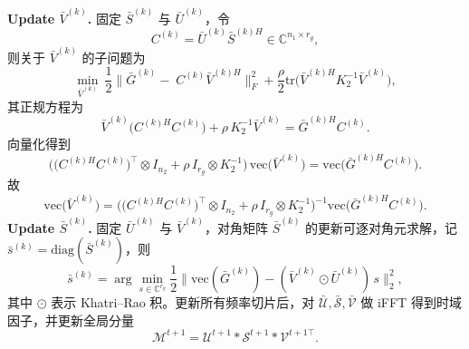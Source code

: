 \documentclass[UTF8]{ctexart}
\begin{document}
\noindent\textbf{Update $\bar V^{(k)}$.}
固定 $\bar S^{(k)}$ 与 $\bar U^{(k)}$，令
\[
C^{(k)}=\bar U^{(k)}\bar S^{(k)H}\in\mathbb{C}^{n_1\times r_g},
\]
则关于 $\bar V^{(k)}$ 的子问题为
\[
\min_{\bar V^{(k)}}\ 
\frac{1}{2}\big\|\bar G^{(k)}-\;C^{(k)}\bar V^{(k)H}\big\|_F^2
+\frac{\rho}{2}\mathrm{tr}\!\big(\bar V^{(k)H}K_2^{-1}\bar V^{(k)}\big),
\]
其正规方程为
\begin{equation}
\bar V^{(k)}\big(C^{(k)H}C^{(k)}\big)+\rho\,K_2^{-1}\bar V^{(k)}
=\bar G^{(k)H}C^{(k)}.
\label{eq:V_normal}
\end{equation}
向量化得到
\begin{equation}
\Big(\big(C^{(k)H}C^{(k)}\big)^{\top}\otimes I_{n_2}+\rho\,I_{r_g}\otimes K_2^{-1}\Big)\,
\mathrm{vec}\!\big(\bar V^{(k)}\big)
=
\mathrm{vec}\!\big(\bar G^{(k)H}C^{(k)}\big).
\label{eq:V_vec_system}
\end{equation}
故
\begin{equation}\mathrm{vec}\!\big(\bar V^{(k)}\big)
=\Big(\big(C^{(k)H}C^{(k)}\big)^{\top}\otimes I_{n_2}+\rho\,I_{r_g}\otimes K_2^{-1}\Big)^{-1}
\mathrm{vec}\!\big(\bar G^{(k)H}C^{(k)}\big).
\end{equation}
\noindent\textbf{Update $\bar S^{(k)}$.}
固定 $\bar U^{(k)}$ 与 $\bar V^{(k)}$，对角矩阵 $\bar S^{(k)}$ 的更新可逐对角元求解，记 $\bar s^{(k)}=\mathrm{diag}(\bar S^{(k)})$，则
\begin{equation}
\bar s^{(k)} = \arg\min_{s\in\mathbb{C}^{r_g}}
\frac12\big\|\mathrm{vec}(\bar G^{(k)}) - (\bar V^{(k)}\odot \bar U^{(k)})\,s\big\|_2^2,
\label{eq:S_update_diag}
\end{equation}
其中 $\odot$ 表示 Khatri--Rao 积。更新所有频率切片后，对 $\bar{\mathcal{U}},\bar{\mathcal{S}},\bar{\mathcal{V}}$ 做 iFFT 得到时域因子，并更新全局分量
\begin{equation}
\mathcal{M}^{t+1}=\mathcal{U}^{t+1}*\mathcal{S}^{t+1}*\mathcal{V}^{t+1\top}.
\label{eq:M_update_new}
\end{equation}
\end{document}
